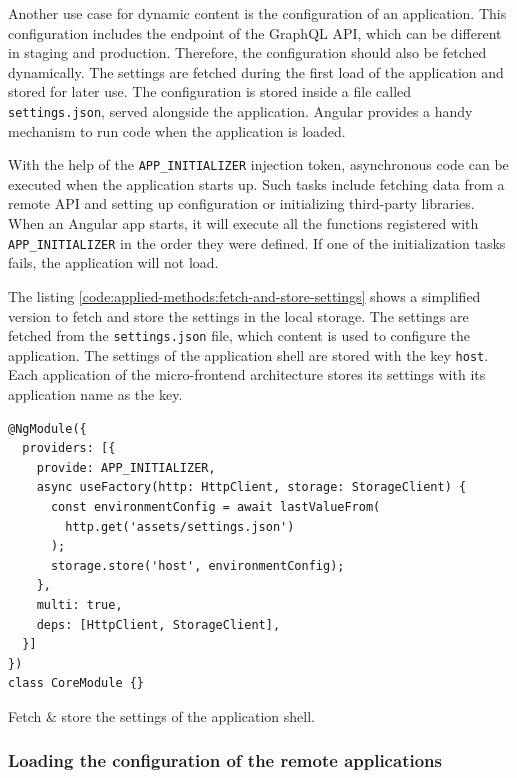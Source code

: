 \noindent Another use case for dynamic content is the configuration of an application. This configuration includes the endpoint of the GraphQL \ac{API}, which can be different in staging and production. Therefore, the configuration should also be fetched dynamically. The settings are fetched during the first load of the application and stored for later use. The configuration is stored inside a file called \texttt{settings.json}, served alongside the application. Angular provides a handy mechanism to run code when the application is loaded.

\bigskip

\noindent With the help of the \texttt{APP\_INITIALIZER} injection token, asynchronous code can be executed when the application starts up. Such tasks include fetching data from a remote \ac{API} and setting up configuration or initializing third-party libraries. When an Angular app starts, it will execute all the functions registered with \texttt{APP\_INITIALIZER} in the order they were defined. If one of the initialization tasks fails, the application will not load. \cite{misc:-:applied-methods:prototype-implementation:angular-app-initializer}

\bigskip

\noindent The listing \ref{code:applied-methods:fetch-and-store-settings} shows a simplified version to fetch and store the settings in the local storage. The settings are fetched from the \texttt{settings.json} file, which content is used to configure the application. The settings of the application shell are stored with the key \texttt{host}. Each application of the micro-frontend architecture stores its settings with its application name as the key.

\ifshowListings
\begin{listing}[H]
\begin{verbatim}
@NgModule({
  providers: [{
    provide: APP_INITIALIZER,
    async useFactory(http: HttpClient, storage: StorageClient) {
      const environmentConfig = await lastValueFrom(
        http.get('assets/settings.json')
      );
      storage.store('host', environmentConfig);
    },
    multi: true,
    deps: [HttpClient, StorageClient],
  }]
})
class CoreModule {}
\end{verbatim}
\caption{Fetch \& store the settings of the application shell.}\label{code:applied-methods:fetch-and-store-settings}
\end{listing}
\fi

\subsubsection{Loading the configuration of the remote applications}\label{subsubsection:applied-methods:prototypical-implementation
:load-the-configuration}


